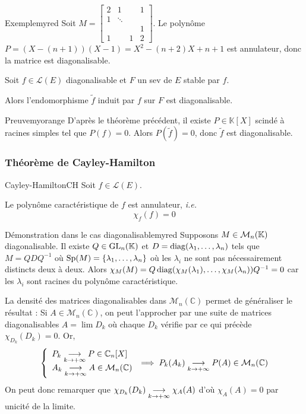     \begin{omed}{Exemple}{myred}
        Soit $M = \begin{bmatrix}
            2 & 1 & & 1 \\
            1 & \ddots & & \\
            & & & 1 \\
            1 & & 1 & 2
        \end{bmatrix}$. Le polynôme $P = (X - (n+1))(X-1) = X^2 - (n+2) X + n+1$ est annulateur, donc la matrice est diagonalisable.
    \end{omed}

    \begin{coro}{}{}
        Soit $f \in \mathcal{L}(E)$ diagonalisable et $F$ un sev de $E$ stable par $f$.

        Alors l’endomorphisme $\tilde{f}$ induit par $f$ sur $F$ est diagonalisable.
    \end{coro}

    \begin{demo}{Preuve}{myorange}
        D’après le théorème précédent, il existe $P \in \mathbb{K}[X]$ scindé à racines simples tel que $P(f) = 0$. Alors $P(\tilde{f}) = 0$, donc $\tilde{f}$ est diagonalisable.
    \end{demo}

    \subsubsection{Théorème de Cayley-Hamilton}

    \begin{theo}{Cayley-Hamilton}{CH}
        Soit $f \in \mathcal{L}(E)$.

        Le polynôme caractéristique de $f$ est annulateur, \textit{i.e.} 
        \[ \chi_f(f) = 0 \]
    \end{theo}

    \begin{demo}{Démonstration dans le cas diagonalisable}{myred}
        Supposons $M \in \mathcal{M}_{n}(\mathbb{K})$ diagonalisable. Il existe $Q \in \operatorname{GL}_n(\mathbb{K})$ et $D = \operatorname{diag}(\lambda_1,\ldots,\lambda_n)$ tels que $M = Q D Q^{-1}$ où $\operatorname{Sp}(M) = \left\{\lambda_1,\ldots,\lambda_n\right\}$ où les $\lambda_i$ ne sont pas nécessairement distincts deux à deux. Alors $\chi_M(M) = Q \operatorname{diag}(\chi_M(\lambda_1), \ldots, \chi_M(\lambda_n)) Q^{-1} = 0$ car les $\lambda_i$ sont racines du polynôme caractéristique.

        La densité des matrices diagonalisables dans $\mathcal{M}_n(\mathbb{C})$ permet de généraliser le résultat : Si $A \in \mathcal{M}_n(\mathbb{C})$, on peut l’approcher par une suite de matrices diagonalisables $A = \lim D_k$ où chaque $D_k$ vérifie par ce qui précède $\chi_{D_k}(D_k) = 0$. Or, 
        \[ \et{P_k \limi{k}{+\infty} P \in \mathbb{C}_n[X]}{A_k \limi{k}{+\infty} A \in \mathcal{M}_n(\mathbb{C})} \implies P_k(A_k) \limi{k}{+\infty} P(A) \in \mathcal{M}_n(\mathbb{C}) \]    
        On peut donc remarquer que $\chi_{D_k}(D_k) \underset{k \rightarrow +\infty}{\longrightarrow} \chi_A(A)$ d’où $\chi_A(A) = 0$ par unicité de la limite.
    \end{demo}

